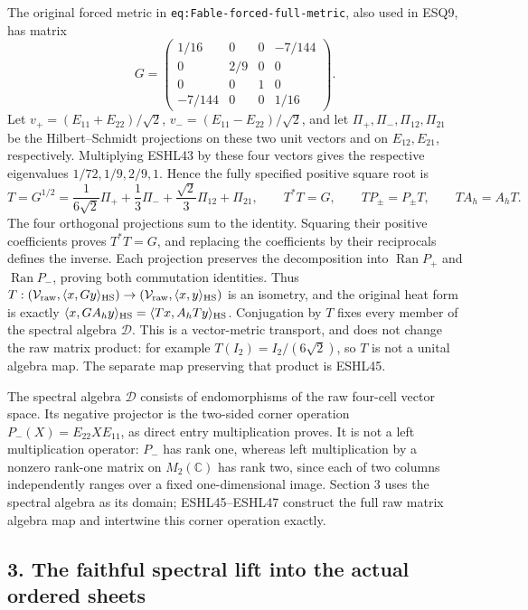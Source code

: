 \documentclass[
  10pt,
  a4paper,
]{article}
\begin{document}
The original forced metric in \texttt{eq:\allowbreak{}Fable-\allowbreak{}forced-\allowbreak{}full-\allowbreak{}metric}, also
used in ESQ9, has matrix \[
G=\begin{pmatrix}
1/16&0&0&-7/144\\
0&2/9&0&0\\
0&0&1&0\\
-7/144&0&0&1/16
\end{pmatrix}.
\tag{ESHL43}
\] Let \(v_+=(E_{11}+E_{22})/\sqrt2\), \(v_-=(E_{11}-E_{22})/\sqrt2\),
and let \(\Pi_+,\Pi_-,\Pi_{12},\Pi_{21}\) be the Hilbert--Schmidt
projections on these two unit vectors and on \(E_{12},E_{21}\),
respectively. Multiplying ESHL43 by these four vectors gives the
respective eigenvalues \(1/72,1/9,2/9,1\). Hence the fully specified
positive square root is \[
T=G^{1/2}=\frac1{6\sqrt2}\Pi_++\frac13\Pi_-
 +\frac{\sqrt2}{3}\Pi_{12}+\Pi_{21},\qquad
T^*T=G,\qquad TP_\pm=P_\pm T,\qquad TA_h=A_hT.
\tag{ESHL44}
\] The four orthogonal projections sum to the identity. Squaring their
positive coefficients proves \(T^*T=G\), and replacing the coefficients
by their reciprocals defines the inverse. Each projection preserves the
decomposition into \(\operatorname{Ran}P_+\) and
\(\operatorname{Ran}P_-\), proving both commutation identities. Thus
\(T:(\mathcal V_{\rm raw},\langle x,Gy\rangle_{\rm HS})\to(\mathcal V_{\rm raw},\langle x,y\rangle_{\rm HS})\)
is an isometry, and the original heat form is exactly
\(\langle x,GA_hy\rangle_{\rm HS}=\langle Tx,A_hTy\rangle_{\rm HS}\).
Conjugation by \(T\) fixes every member of the spectral algebra
\(\mathcal D\). This is a vector-metric transport, and does not change
the raw matrix product: for example \(T(I_2)=I_2/(6\sqrt2)\), so \(T\)
is not a unital algebra map. The separate map preserving that product is
ESHL45.

The spectral algebra \(\mathcal D\) consists of endomorphisms of the raw
four-cell vector space. Its negative projector is the two-sided corner
operation \(P_-(X)=E_{22}XE_{11}\), as direct entry multiplication
proves. It is not a left multiplication operator: \(P_-\) has rank one,
whereas left multiplication by a nonzero rank-one matrix on
\(M_2(\mathbb C)\) has rank two, since each of two columns independently
ranges over a fixed one-dimensional image. Section 3 uses the spectral
algebra as its domain; ESHL45--ESHL47 construct the full raw matrix
algebra map and intertwine this corner operation exactly.

\subsection{3. The faithful spectral lift into the actual ordered
sheets}\label{the-faithful-spectral-lift-into-the-actual-ordered-sheets}
\end{document}
